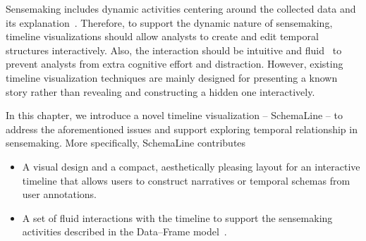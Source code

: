 Sensemaking includes dynamic activities centering around the collected data and its explanation~\cite{Klein2003}. Therefore, to support the dynamic nature of sensemaking, timeline visualizations should allow analysts to create and edit temporal structures interactively. Also, the interaction should be intuitive and fluid~\cite{Elmqvist2011} to prevent analysts from extra cognitive effort and distraction. However, existing timeline visualization techniques are mainly designed for presenting a known story rather than revealing and constructing a hidden one interactively.

In this chapter, we introduce a novel timeline visualization -- SchemaLine -- to address the aforementioned issues and support exploring temporal relationship in sensemaking. More specifically, SchemaLine contributes
\begin{itemize}
	\item A visual design and a compact, aesthetically pleasing layout for an interactive timeline that allows users to construct narratives or temporal schemas from user annotations.
	\item A set of fluid interactions with the timeline to support the sensemaking activities described in the Data--Frame model~\cite{Klein2003}.
\end{itemize}